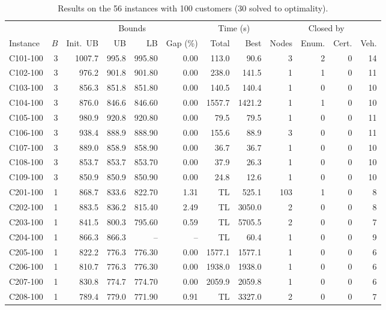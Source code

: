 \documentclass[10pt]{article}
\begin{document}
\begin{table}[p]
\centering
\caption{Results on the 56 instances with 100 customers (30 solved to optimality).}
\label{tab:n100}
\footnotesize
\setlength{\tabcolsep}{5pt}
\begin{tabular}{lrrrrrrrrrrr}
\toprule
 & & \multicolumn{4}{c}{Bounds} & \multicolumn{2}{c}{Time (s)} & & \multicolumn{2}{c}{Closed by} & \\
\cmidrule(lr){3-6}\cmidrule(lr){7-8}\cmidrule(lr){10-11}
Instance & $B$ & Init.\ UB & UB & LB & Gap (\%) & Total & Best & Nodes & Enum. & Cert. & Veh. \\
\midrule
C101-100 & 3 & 1007.7 & 995.8 & 995.80 & 0.00 & 113.0 & 90.6 & 3 & 2 & 0 & 14 \\
C102-100 & 3 & 976.2 & 901.8 & 901.80 & 0.00 & 238.0 & 141.5 & 1 & 1 & 0 & 11 \\
C103-100 & 3 & 856.3 & 851.8 & 851.80 & 0.00 & 140.5 & 140.4 & 1 & 0 & 0 & 10 \\
C104-100 & 3 & 876.0 & 846.6 & 846.60 & 0.00 & 1557.7 & 1421.2 & 1 & 1 & 0 & 10 \\
C105-100 & 3 & 980.9 & 920.8 & 920.80 & 0.00 & 79.5 & 79.5 & 1 & 0 & 0 & 11 \\
C106-100 & 3 & 938.4 & 888.9 & 888.90 & 0.00 & 155.6 & 88.9 & 3 & 0 & 0 & 11 \\
C107-100 & 3 & 889.0 & 858.9 & 858.90 & 0.00 & 36.7 & 36.7 & 1 & 0 & 0 & 10 \\
C108-100 & 3 & 853.7 & 853.7 & 853.70 & 0.00 & 37.9 & 26.3 & 1 & 0 & 0 & 10 \\
C109-100 & 3 & 850.9 & 850.9 & 850.90 & 0.00 & 24.8 & 12.6 & 1 & 0 & 0 & 10 \\
\midrule
C201-100 & 1 & 868.7 & 833.6 & 822.70 & 1.31 & TL & 525.1 & 103 & 1 & 0 & 8 \\
C202-100 & 1 & 883.5 & 836.2 & 815.40 & 2.49 & TL & 3050.0 & 2 & 0 & 0 & 8 \\
C203-100 & 1 & 841.5 & 800.3 & 795.60 & 0.59 & TL & 5705.5 & 2 & 0 & 0 & 7 \\
C204-100 & 1 & 866.3 & 866.3 & -- & -- & TL & 60.4 & 1 & 0 & 0 & 9 \\
C205-100 & 1 & 822.2 & 776.3 & 776.30 & 0.00 & 1577.1 & 1577.1 & 1 & 0 & 0 & 6 \\
C206-100 & 1 & 810.7 & 776.3 & 776.30 & 0.00 & 1938.0 & 1938.0 & 1 & 0 & 0 & 6 \\
C207-100 & 1 & 830.8 & 774.7 & 774.70 & 0.00 & 2059.9 & 2059.8 & 1 & 0 & 0 & 6 \\
C208-100 & 1 & 789.4 & 779.0 & 771.90 & 0.91 & TL & 3327.0 & 2 & 0 & 0 & 7 \\

\end{tabular}
\end{table}
\end{document}
